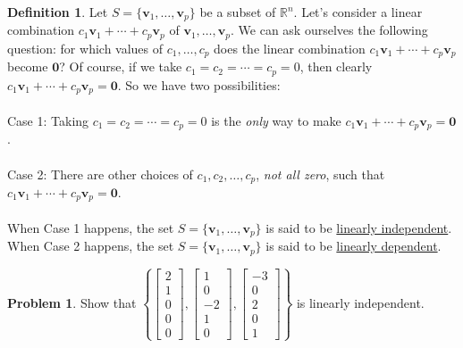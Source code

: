 \documentclass[12pt,letterpaper]{book}
\numberwithin{equation}{section}
\theoremstyle{definition}
\newtheorem{defi}[thm]{\textbf{Definition}}
\newtheorem{problem}[thm]{\textbf{Problem}}
\newcommand{\vv}{\bm{v}}
\newcommand{\veczero}{\bm{0}}
\begin{document}
\begin{defi}\label{ind definition}
Let $S=\{\vv_1,\ldots,\vv_p\}$ be a subset of $\mathbb{R}^n$. Let's consider a linear combination
$c_1\vv_1+\cdots+c_p\vv_p$ of $\vv_1,\ldots,\vv_p$. We can ask
ourselves the following question: for which values of
$c_1,\ldots,c_p$ does the linear combination
$c_1\vv_1+\cdots+c_p\vv_p$ become $\veczero$? Of
course, if we take $c_1=c_2=\cdots=c_p=0$, then clearly
$c_1\vv_1+\cdots+c_p\vv_p=\veczero$. So we have two possibilities:\\\\
Case 1: Taking $c_1=c_2=\cdots=c_p=0$ is the \textit{only} way
to make $c_1\vv_1+\cdots+c_p\vv_p=\veczero$.\\\\
Case 2: There are other choices of $c_1,c_2,\ldots,c_p$,
\textit{not all zero}, such that $c_1\vv_1+\cdots+c_p\vv_p=\veczero$.\\\\
When Case 1 happens, the set $S=\{\vv_1,\ldots,\vv_p\}$ is said to
be \underline{linearly independent}.
When Case 2 happens, the set $S=\{\vv_1,\ldots,\vv_p\}$ is said to
be \underline{linearly dependent}.
\end{defi}

\begin{problem}\label{first lin ind}
Show that $\left\{\left[\begin{array}{r} 2 \\ 1
\\ 0 \\ 0 \\ 0 \end{array}\right],\left[\begin{array}{r} 1 \\ 0
\\ -2 \\ 1 \\ 0 \end{array}\right],\left[\begin{array}{r} -3 \\ 0
\\ 2 \\ 0 \\ 1 \end{array}\right]\right\}$ is linearly independent.
\end{problem}
\end{document}
